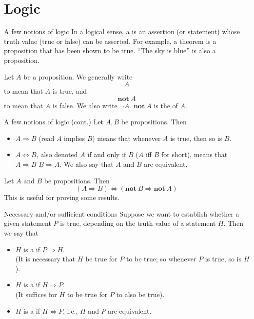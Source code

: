 \documentclass[aspectratio=169]{beamer}
\begin{document}
\section{Logic}

\begin{frame}{A few notions of logic}
In a logical sense, a  is an assertion (or statement)
whose truth value (true or false) can be asserted. For example, a theorem is a
proposition that has been shown to be true. ``The sky is blue'' is also a
proposition. 

Let $A$ be a proposition. We generally write
\[
A
\]
to mean that $A$ is true, and 
\[
\mathbf{not}\ A
\]
to mean that $A$ is false. We also write $\neg A$.
$\mathbf{not}\ A$ is the  of $A$.
\end{frame}


\begin{frame}{A few notions of logic (cont.)}
Let $A,B$ be propositions. Then
\begin{itemize}
\item $A\Rightarrow B$ (read $A$ implies $B$) means that whenever $A$ is true,
then so is $B$.
\item $A\Leftrightarrow B$, also denoted $A$ if and only if $B$ ($A$
iff $B$ for short), means that $A\Rightarrow B$  $B\Rightarrow A$.
We also say that $A$ and $B$ are equivalent.
\end{itemize}
Let $A$ and $B$ be propositions. Then
\[
(A\Rightarrow B)\Leftrightarrow(\mathbf{not}\ B\Rightarrow\mathbf{not}\ A)
\]
This is useful for proving some results.
\end{frame}



\begin{frame}{Necessary and/or sufficient conditions}
Suppose we want to establish whether a given statement $P$ is true, depending
on the truth value of a statement $H$. Then we say that
\begin{itemize}
\item $H$ is a  if $P\Rightarrow H$. \\
(It is necessary that $H$ be true for $P$ to be true; so whenever
$P$ is true, so is $H$).
\item $H$ is a  if $H\Rightarrow P$. \\
(It suffices for $H$ to be true for $P$ to also be true).
\item $H$ is a  if $H\Leftrightarrow
P$, i.e., $H$ and $P$ are equivalent.
\end{itemize}
\end{frame}
\end{document}
